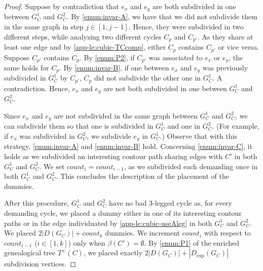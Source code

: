 \documentclass[runningheads]{llncs}
\begin{document}
\begin{proof}
Suppose by contradiction that $e_x$ and $e_y$ are both subdivided in one between $G^1_C$ and $G^2_C$. By \ref{enum:invar-A}, we have that we did not subdivide them in the same graph in step $j\in[1,j-1]$. Hence, they were subdivided in two different steps, while analyzing two different cycles $C_p$ and $C_{p'}$. As they share at least one edge and by \cref{app-le:cubic-TCcomp}, either $C_p$ contains $C_{p'}$ or vice versa. Suppose $C_{p'}$ contains $C_p$. By \ref{enum:P2}, if $C_{p'}$ was associated to $e_x$ or $e_y$, the same holds for $C_p$. By \ref{enum:invar-B}, if one between $e_x$ and $e_y$ was previously subdivided in $G^1_C$ by $C_{p'}$, $C_p$ did not subdivide the other one in $G^1_C$. A contradiction. Hence, $e_x$ and $e_y$ are not both subdivided in one between $G^1_C$ and $G^2_C$.

Since $e_x$ and $e_y$ are not subdivided in the same graph between $G^1_C$ and $G^2_C$, we can subdivide them so that one is subdivided in $G^1_C$ and one in $G^2_C$. (For example, if $e_x$ was subdivided in $G^2_C$, we subdivide $e_y$ in $G^1_C$.) Observe that with this strategy, \ref{enum:invar-A} and \ref{enum:invar-B} hold. Concerning \ref{enum:invar-C}, it holds as we subdivided an interesting contour path sharing edges with $C'$ in both $G^1_C$ and $G^2_C$. We set $count_{i}=count_{i-1}$, as we subdivided each demanding once in both $G^1_C$ and $G^2_C$. This concludes the description of the placement of the dummies.

After this procedure, $G^1_C$ and $G^2_C$ have no bad 3-legged cycle as, for every demanding cycle, we placed a dummy either in one of its interesting contour paths or in the edge individuated by \cref{app-le:cubic-useAleg} in both $G^1_C$ and $G^2_C$. We placed $2|D(G_C)|+count_k$ dummies.
We increment $count_i$ with respect to $count_{i-1}$ ($i\in [1,k]$) only when $\beta(C')=\emptyset$. By \ref{enum:P1} of the enriched genealogical tree $T^+(C)$, we placed exactly $2|D(G_C)|+|D_{\exp}(G_C)|$ subdivision vertices. 





\end{proof}
\end{document}
